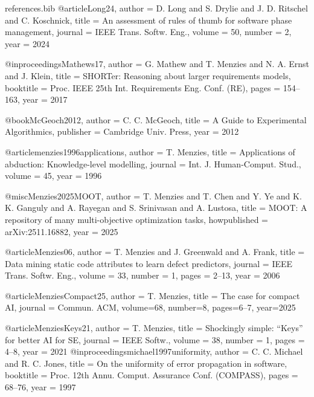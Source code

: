\documentclass[runningheads]{llncs}
\begin{document}
\begin{filecontents}{references.bib}
@article{Long24,
  author  = {D. Long and S. Drylie and J. D. Ritschel and C. Koschnick},
  title   = {An assessment of rules of thumb for software phase management},
  journal = {IEEE Trans. Softw. Eng.},
  volume  = {50},
  number  = {2},
  year    = {2024}
}



@inproceedings{Mathews17,
  author    = {G. Mathew and T. Menzies and N. A. Ernst and J. Klein},
  title     = {SHORTer: Reasoning about larger requirements models},
  booktitle = {Proc. IEEE 25th Int. Requirements Eng. Conf. (RE)},
  pages     = {154--163},
  year      = {2017}
}

@book{McGeoch2012,
  author    = {C. C. McGeoch},
  title     = {A Guide to Experimental Algorithmics},
  publisher = {Cambridge Univ. Press},
  year      = {2012}
}



@article{menzies1996applications,
  author  = {T. Menzies},
  title   = {Applications of abduction: Knowledge-level modelling},
  journal = {Int. J. Human-Comput. Stud.},
  volume  = {45},
  year    = {1996}
}



@misc{Menzies2025MOOT,
  author = {T. Menzies and T. Chen and Y. Ye and K. K. Ganguly and A. Rayegan and S. Srinivasan and A. Lustosa},
  title  = {MOOT: A repository of many multi-objective optimization tasks},
  howpublished = {arXiv:2511.16882},
  year   = {2025}
}



@article{Menzies06,
  author  = {T. Menzies and J. Greenwald and A. Frank},
  title   = {Data mining static code attributes to learn defect predictors},
  journal = {IEEE Trans. Softw. Eng.},
  volume  = {33},
  number  = {1},
  pages   = {2--13},
  year    = {2006}
}

@article{MenziesCompact25,
  author  = {T. Menzies},
  title   = {The case for compact AI},
  journal = {Commun. ACM},
  volume={68},
  number={8},
  pages={6--7},
  year={2025}
}

@article{MenziesKeys21,
  author  = {T. Menzies},
  title   = {Shockingly simple: ``Keys'' for better AI for SE},
  journal = {IEEE Softw.},
  volume  = {38},
  number  = {1},
  pages   = {4--8},
  year    = {2021}
}
@inproceedings{michael1997uniformity,
  author    = {C. C. Michael and R. C. Jones},
  title     = {On the uniformity of error propagation in software},
  booktitle = {Proc. 12th Annu. Comput. Assurance Conf. (COMPASS)},
  pages     = {68--76},
  year      = {1997}
}


\end{filecontents}
\end{document}
